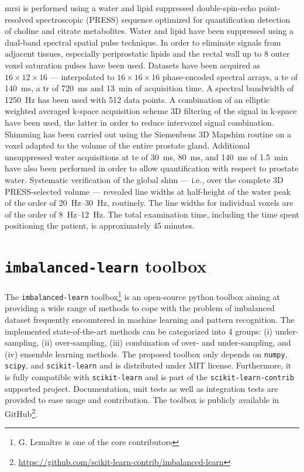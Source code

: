 \ac{mrsi} is performed using a water and lipid suppressed double-spin-echo point-resolved spectroscopic (PRESS) sequence optimized for quantification detection of choline and citrate metabolites.
Water and lipid have been suppressed using a dual-band spectral spatial pulse technique.
In order to eliminate signals from adjacent tissues, especially periprostatic lipids and the rectal wall up to 8 outer voxel saturation pulses have been used.
Datasets have been acquired as $16 \times 12 \times 16$ --- interpolated to $16 \times 16 \times 16$ phase-encoded spectral arrays, a \ac{te} of \SI{140}{\ms}, a \ac{tr} of \SI{720}{\ms} and \SI{13}{\minute} of acquisition time.
A spectral bandwidth of \SI{1250}{\hertz} has been used with 512 data points.
A combination of an elliptic weighted averaged k-space acquisition scheme 3D filtering of the signal in k-space have been used, the latter in order to reduce intervoxel signal combination.
Shimming has been carried out using the Siemenbens 3D Mapshim routine on a voxel adapted to the volume of the entire prostate gland.
Additional unsuppressed water acquisitions at \ac{te} of \SI{30}{\ms}, \SI{80}{\ms}, and \SI{140}{\ms} of \SI{1.5}{\minute} have also been performed in order to allow quantification with respect to prostate water.
Systematic verification of the global shim --- i.e., over the complete 3D PRESS-selected volume --- revealed line widths at half-height of the water peak of the order of \SIrange{20}{30}{\hertz}, routinely.
The line widths for individual voxels are of the order of \SIrange{8}{12}{\hertz}.
The total examination time, including the time spent positioning the patient, is approximately 45 minutes.


\section{\texttt{imbalanced-learn} toolbox}\label{chp4:sec:imblearn}

The \texttt{imbalanced-learn} toolbox\footnote{G. Lema\^itre is one of the core contributors} is an open-source python toolbox aiming at providing a wide range of methods to cope with the problem of imbalanced dataset frequently encountered in machine learning and pattern recognition.
The implemented state-of-the-art methods can be categorized into 4 groups: (i) under-sampling, (ii) over-sampling, (iii) combination of over- and under-sampling, and (iv) ensemble learning methods.
The proposed toolbox only depends on \texttt{numpy}, \texttt{scipy}, and \texttt{scikit-learn} and is distributed under MIT license.
Furthermore, it is fully compatible with \texttt{scikit-learn} and is part of the \texttt{scikit-learn-contrib} supported project.
Documentation, unit tests as well as integration tests are provided to ease usage and contribution.
The toolbox is publicly available in GitHub\footnote{\url{https://github.com/scikit-learn-contrib/imbalanced-learn}}.

